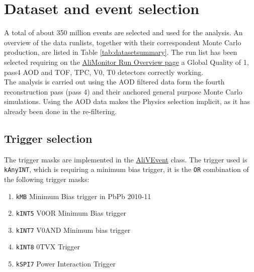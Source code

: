 \section{Dataset and event selection}
\label{sec:Dataset_and_event_selection}

A total of about 350 million events are selected and used for the analysis. An overview of the data runlists, together with their correspondent Monte Carlo production, are listed in Table \ref{tab:datasetsummary}. The run list has been selected requiring on the \href{https://alimonitor.cern.ch/configuration/index.jsp}{AliMonitor Run Overview page} a Global Quality of 1, pass4 AOD and TOF, TPC, V0, T0 detectors correctly working.\\
The analysis is carried out using the AOD filtered data form the fourth reconstruction pass (pass 4) and their anchored general purpose Monte Carlo simulations. Using the AOD data makes the Physics selection implicit, as it has already been done in the re-filtering.

\subsection{Trigger selection}
The trigger masks are implemented in the \href{https://github.com/alisw/AliRoot/blob/master/STEER/STEERBase/AliVEvent.h}{AliVEvent} class. The trigger used is \texttt{kAnyINT}, which is requiring a minimum bias trigger, it is the \texttt{OR} combination of the following trigger masks:
\begin{enumerate}
\item \texttt{kMB} Minimum Bias trigger in PbPb 2010-11
\item \texttt{kINT5} V0OR Minimum Bias trigger
\item \texttt{kINT7} V0AND Minimum bias trigger
\item \texttt{kINT8} 0TVX Trigger
\item \texttt{kSPI7} Power Interaction Trigger
\end{enumerate}

